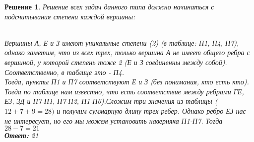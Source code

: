 \documentclass[12pt]{article}
\theoremstyle{problem_style}
\newtheorem{solution}{Решение}[subsection]
\begin{document}
\begin{solution}
Решение всех задач данного типа должно начинаться с подсчитывания степени каждой вершины:
\begin{figure}[h]
    \centering
\end{figure}\\
Вершины А, Е и З имеют уникальные степени (2) (в таблице: П1, П4, П7), однако заметим, что из всех трех, только вершина А не имеет общего ребра с вершиной, у которой степень тоже 2 (Е и З соединенны между собой). Соответственно, в таблице это - П4.\\
Тогда, пункты П1 и П7 соответствуют Е и З (без понимания, кто есть кто). Тогда по таблице нам известно, что есть соответствие между ребрами ГЕ, ЕЗ, ЗД и П7-П1, П7-П2, П1-П6).Сложим три значения из таблицы ($12 + 7 + 9 = 28)$ и получим суммарную длину трех ребер. Однако ребро ЕЗ нас не интересует, но его мы можем установить наверняка П1-П7. Тогда $28 - 7 = 21$\\
\textbf{Ответ:} 21
\end{solution}
\break
\end{document}
